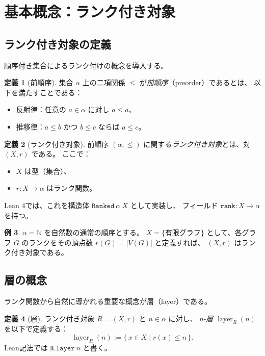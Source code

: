 \documentclass[11pt,a4paper,ja=standard]{bxjsarticle}
\theoremstyle{definition}
\newtheorem{definition}{定義}[section]
\newtheorem{example}[definition]{例}
\newcommand{\layer}{\operatorname{layer}}
\newcommand{\Ranked}{\mathtt{Ranked}}
\begin{document}
\section{基本概念：ランク付き対象}

\subsection{ランク付き対象の定義}

順序付き集合によるランク付けの概念を導入する。

\begin{definition}[前順序]
集合 $\alpha$ 上の二項関係 $\le$ が\emph{前順序}（preorder）であるとは、
以下を満たすことである：
\begin{itemize}
\item 反射律：任意の $a \in \alpha$ に対し $a \le a$、
\item 推移律：$a \le b$ かつ $b \le c$ ならば $a \le c$。
\end{itemize}
\end{definition}

\begin{definition}[ランク付き対象]\label{def:ranked}
前順序 $(\alpha, \le)$ に関する\emph{ランク付き対象}とは、対 $(X, r)$ である。
ここで：
\begin{itemize}
\item $X$ は型（集合）、
\item $r : X \to \alpha$ はランク関数。
\end{itemize}
Lean 4では、これを構造体 $\Ranked\ \alpha\ X$ として実装し、
フィールド $\mathtt{rank} : X \to \alpha$ を持つ。
\end{definition}

\begin{example}
$\alpha = \mathbb{N}$ を自然数の通常の順序とする。
$X = \{$有限グラフ$\}$ として、各グラフ $G$ のランクをその頂点数 $r(G) = |V(G)|$ と定義すれば、
$(X, r)$ はランク付き対象である。
\end{example}

\subsection{層の概念}

ランク関数から自然に導かれる重要な概念が層（layer）である。

\begin{definition}[層]\label{def:layer}
ランク付き対象 $R = (X, r)$ と $n \in \alpha$ に対し、
$n$-\emph{層} $\layer_R(n)$ を以下で定義する：
\[
  \layer_R(n) := \{\, x \in X \mid r(x) \le n \,\}.
\]
Lean記法では $\mathtt{R.layer}\ n$ と書く。
\end{definition}
\end{document}
